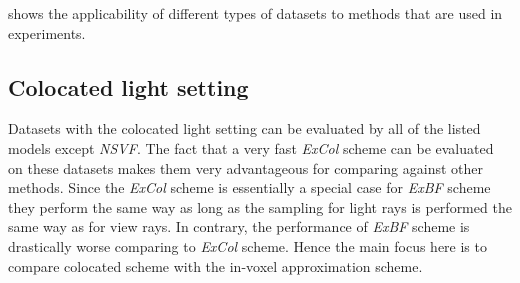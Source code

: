  shows the applicability of different types of datasets to methods that are used in experiments.






\subsection{Colocated light setting}

Datasets with the colocated light setting can be evaluated by all of the listed models except \textit{NSVF}.
The fact that a very fast \textit{ExCol} scheme can be evaluated on these datasets
makes them very advantageous for comparing against other methods.
Since the \textit{ExCol} scheme is essentially a special case for \textit{ExBF} scheme
they perform the same way as long as the sampling for light rays is performed the same way as for view rays.
In contrary, the performance of \textit{ExBF} scheme is drastically worse comparing to \textit{ExCol} scheme.
Hence the main focus here is to compare colocated scheme with the in-voxel approximation scheme.





